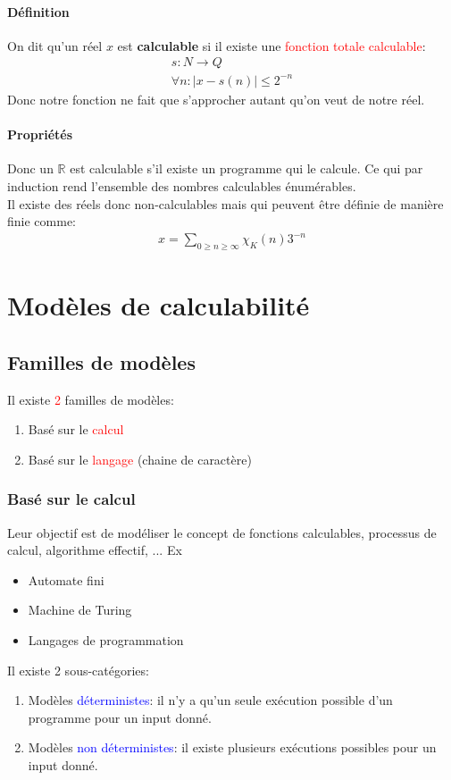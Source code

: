 \documentclass{report}
\begin{document}
\subsubsection{Définition}
On dit qu'un réel $x$ est \textbf{calculable} si il existe une \textcolor{red}{fonction totale calculable}:
\begin{align*}
s: N \rightarrow Q\\
\forall n: |x-s(n)| \leq 2^{-n}
\end{align*}
Donc notre fonction ne fait que s'approcher autant qu'on veut de notre réel.

\subsubsection{Propriétés}
Donc un $\mathbb{R}$ est calculable s'il existe un programme qui le calcule. Ce qui par induction rend l'ensemble des nombres calculables énumérables.\\
Il existe des réels donc non-calculables mais qui peuvent être définie de manière finie comme:
\begin{align*}
x = \sum_{0 \geq n \geq \infty} \chi_K (n) 3^{-n}
\end{align*}


\chapter{Modèles de calculabilité}

\section{Familles de modèles}
\noindent 
Il existe \textcolor{red}{2} familles de modèles:
\begin{enumerate}
\item Basé sur le \textcolor{red}{calcul}
\item Basé sur le \textcolor{red}{langage} (chaine de caractère)
\end{enumerate}

\subsection{Basé sur le calcul}
Leur objectif est de modéliser le concept de fonctions calculables, processus de calcul, algorithme effectif, ... Ex
\begin{itemize}
\item Automate fini
\item Machine de Turing
\item Langages de programmation
\end{itemize}
Il existe 2 sous-catégories:
\begin{enumerate}
\item Modèles \textcolor{blue}{déterministes}: il n'y a qu'un seule exécution possible d'un programme pour un input donné.
\item Modèles \textcolor{blue}{non déterministes}: il existe plusieurs exécutions possibles pour un input donné.
\end{enumerate}
\end{document}
